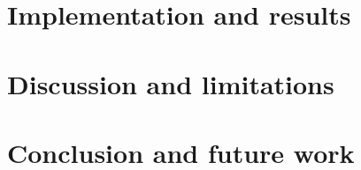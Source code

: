 \chapter{Implementation and results}
\label{chap:implementation}
\chapter{Discussion and limitations}
\label{chap:discussion}
\chapter{Conclusion and future work}
\label{chap:conclusion}